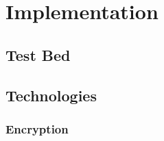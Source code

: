 \documentclass[12pt]{report}
\begin{document}
\chapter{Implementation}

\section{Test Bed} %


\section{Technologies}

\subsection{Encryption}
\end{document}
